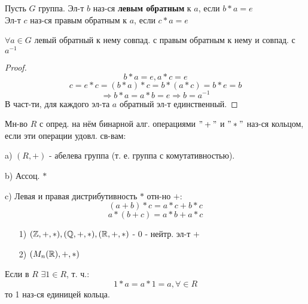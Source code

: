 \begin{definition}
Пусть $G$ группа. Эл-т $b$ наз-ся \textbf{левым обратным} к $a$, если $b * a = e$ \\

Эл-т $c$ наз-ся правым обратным к $a$, если $c * a = e$
\end{definition}
\begin{statement}
$\forall a \in G$ левый обратный к нему совпад. с правым обратным к нему и совпад. с $a^{-1}$
\end{statement}
\begin{proof}
  \[
  b * a = e, a * c = e
  \]
\[
  c = e * c = (b * a) * c = b * (a * c) = b * e = b
\]
\[
  \Rightarrow b * a = a * b = e \Rightarrow b = a^{-1}
\]
В част-ти, для каждого эл-та $a$ обратный эл-т единственный.
\end{proof}
\begin{definition}
Мн-во $R$ с опред. на нём бинарной алг. операциями $"+"$ и $"*"$ наз-ся кольцом, если эти операции удовл. св-вам:
\item [a) ] $(R, +)$ - абелева группа (т. е. группа с комутативностью).
\item [b) ] Ассоц. $*$
\item [c) ] Левая и правая дистрибутивность $*$ отн-но $+$:
  \[
    (a + b) * c = a * c + b * c
  \]
  \[
    a * (b + c) = a * b + a * c
  \]
\end{definition}
\begin{example}
\begin{itemize}
  \item [1) ] $(\mathbb{Z}, +, *), (\mathbb{Q}, +, *), (\mathbb{R}, +, *)$ - 0 - нейтр. эл-т $+$
  \item [2) ] $(M_n(\mathbb{R}), +, *)$
\end{itemize}
\end{example}
\begin{definition}
Если в $R$ $\exists 1 \in R$, т. ч.:
\[
1 * a = a * 1 = a, \forall \in R
\]
то 1 наз-ся единицей кольца.
\end{definition}
